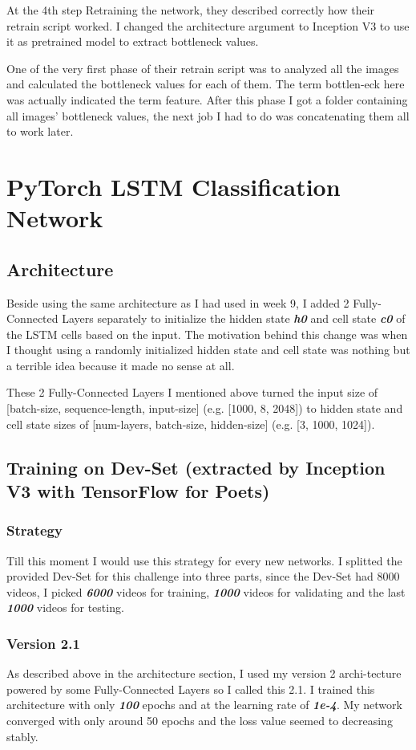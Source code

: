 At the 4th step Retraining the network, they described correctly how their retrain script worked. I changed the architecture argument to Inception V3 to use it as pretrained model to extract bottleneck values. 

One of the very first phase of their retrain script  was to analyzed all the images and calculated the bottleneck values for each of them. The term bottlen-eck here was actually indicated the term feature. After this phase I got a folder containing all images' bottleneck values, the next job I had to do was concatenating them all to work later.

\section{PyTorch LSTM Classification Network}
\subsection{Architecture}
Beside using the same architecture as I had used in week 9, I added 2 Fully-Connected Layers separately to initialize the hidden state \textbf{\emph{h0}} and cell state \textbf{\emph{c0}} of the LSTM cells based on the input. The motivation behind this change was when I thought using a randomly initialized hidden state and cell state was nothing but a terrible idea because it made no sense at all.

These 2 Fully-Connected Layers I mentioned above turned the input size of [batch-size, sequence-length, input-size] (e.g. [1000, 8, 2048]) to hidden state and cell state sizes of [num-layers, batch-size, hidden-size] (e.g. [3, 1000, 1024]).

\subsection{Training on Dev-Set (extracted by Inception V3 with TensorFlow for Poets)}
\subsubsection{Strategy}
Till this moment I would use this strategy for every new networks. I splitted the provided Dev-Set for this challenge into three parts, since the Dev-Set had 8000 videos, I picked \textbf{\emph{6000}} videos for training, \textbf{\emph{1000}} videos for validating and the last \textbf{\emph{1000}} videos for testing.

\subsubsection{Version 2.1}
As described above in the architecture section, I used my version 2 archi-tecture powered by some Fully-Connected Layers so I called this 2.1. I trained this architecture with only \textbf{\emph{100}} epochs and at the learning rate of \textbf{\emph{1e-4}}. My network converged with only around 50 epochs and the loss value seemed to decreasing stably.

